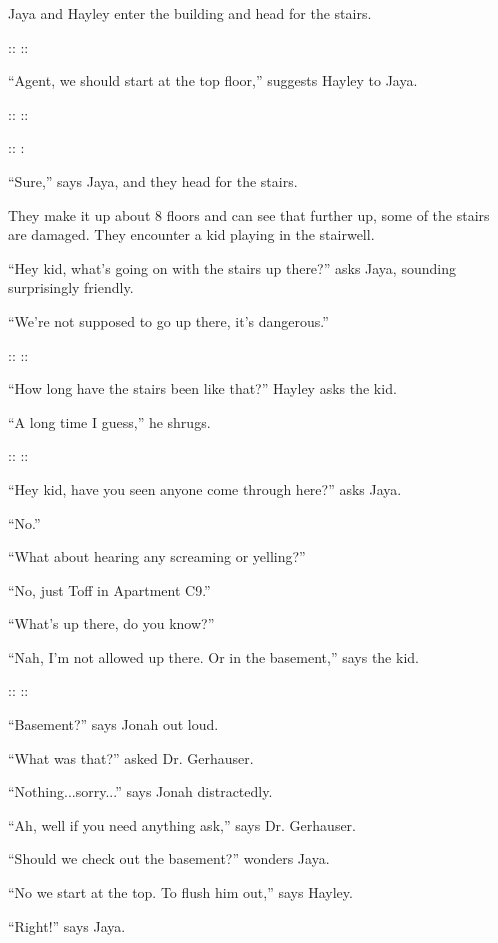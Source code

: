 Jaya and Hayley enter the building and head for the stairs.

::  ::

``Agent, we should start at the top floor,'' suggests Hayley to Jaya.

::  ::

::  : 

``Sure,'' says Jaya, and they head for the stairs.



They make it up about 8 floors and can see that further up, some of the stairs are damaged.  They encounter a kid playing in the stairwell.

``Hey kid, what's going on with the stairs up there?'' asks Jaya, sounding surprisingly friendly.

``We're not supposed to go up there, it's dangerous.''

::  ::

``How long have the stairs been like that?'' Hayley asks the kid.

``A long time I guess,'' he shrugs.

::  ::

``Hey kid, have you seen anyone come through here?'' asks Jaya.

``No.''

``What about hearing any screaming or yelling?''

``No, just Toff in Apartment C9.''

``What's up there, do you know?''

``Nah, I'm not allowed up there.  Or in the basement,'' says the kid.

::  ::

``Basement?'' says Jonah out loud.  

``What was that?'' asked Dr. Gerhauser.

``Nothing...sorry...'' says Jonah distractedly.

``Ah, well if you need anything ask,'' says Dr. Gerhauser.



``Should we check out the basement?'' wonders Jaya.

``No we start at the top.  To flush him out,'' says Hayley.

``Right!'' says Jaya.  



